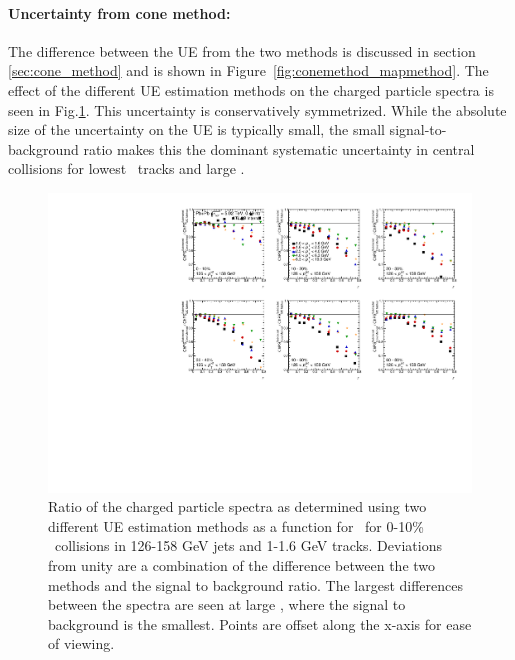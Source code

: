 

\paragraph{Uncertainty from cone method: } The difference between the UE from the two methods is discussed in section \ref{sec:cone_method} and is shown in Figure~\ref{fig:conemethod_mapmethod}.
The effect of the different UE estimation methods on the charged particle spectra is seen in Fig.\ref{fig:conemethod_chps_comparison}.
This uncertainty is conservatively symmetrized.
While the absolute size of the uncertainty on the UE is typically small, the small signal-to-background ratio makes this the dominant systematic uncertainty in central collisions for lowest \pT\ tracks and large \rvar.

\begin{figure}
\centerline{\includegraphics[page=2,width=1.\textwidth]{figures/main/systematics/ChPS_UE_Comparison}}
\caption{Ratio of the charged particle spectra as determined using two different UE estimation methods as a function for \rvar\ for 0-10\% \pbpb\ collisions in 126-158 GeV jets and 1-1.6 GeV tracks.
Deviations from unity are a combination of the difference between the two methods and the signal to background ratio.
The largest differences between the spectra are seen at large \rvar, where the signal to background is the smallest.
Points are offset along the x-axis for ease of viewing.}
\label{fig:conemethod_chps_comparison}
\end{figure}




